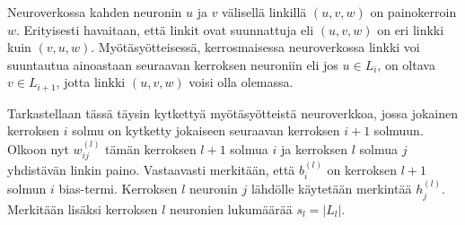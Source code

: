 \documentclass[12pt,a4paper,finnish,oneside,titlepage]{article}
\theoremstyle{plain}
\theoremstyle{definition}
\theoremstyle{remark}
\begin{document}
Neuroverkossa kahden neuronin \(u\) ja \(v\) välisellä linkillä \((u, v, w)\) on painokerroin \(w\). Erityisesti havaitaan, että linkit ovat suunnattuja eli \((u, v, w)\) on eri linkki kuin \((v, u, w)\). Myötäsyötteisessä, kerrosmaisessa neuroverkossa linkki voi suuntautua ainoastaan seuraavan kerroksen neuroniin eli jos \(u\in L_i\), on oltava \(v\in L_{i+1}\), jotta linkki \((u, v, w)\) voisi olla olemassa.

Tarkastellaan tässä täysin kytkettyä myötäsyötteistä neuroverkkoa, jossa jokainen kerroksen \(i\) solmu on kytketty jokaiseen seuraavan kerroksen \(i+1\) solmuun. Olkoon nyt \(w_{ij}^{(l)}\) tämän kerroksen \(l+1\) solmua \(i\) ja kerroksen \(l\) solmua \(j\) yhdistävän linkin paino. Vastaavasti merkitään, että \(b_i^{(l)}\) on kerroksen \(l+1\) solmun \(i\) bias-termi. Kerroksen \(l\) neuronin \(j\) lähdölle käytetään merkintää \(h_j^{(l)}\). Merkitään lisäksi kerroksen \(l\) neuronien lukumäärää \(s_l=\left|L_l\right|\).
\end{document}
